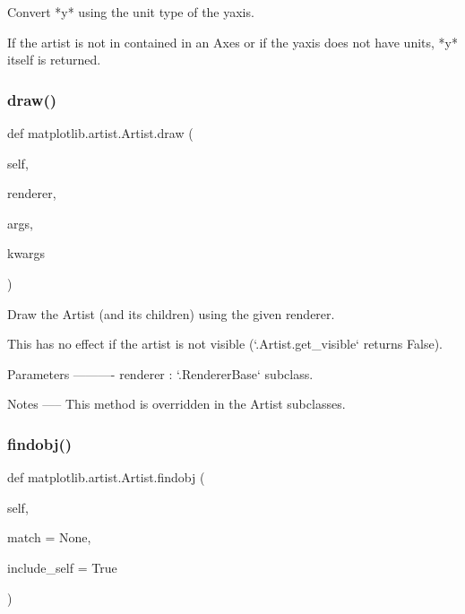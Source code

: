 \begin{DoxyVerb}Convert *y* using the unit type of the yaxis.

If the artist is not in contained in an Axes or if the yaxis does not
have units, *y* itself is returned.
\end{DoxyVerb}
 \mbox{\label{classmatplotlib_1_1artist_1_1Artist_a5ed9a21a1ca45a835ea296f654ae9d35}} 
\subsubsection{\texorpdfstring{draw()}{draw()}}
{\footnotesize\ttfamily def matplotlib.\+artist.\+Artist.\+draw (\begin{DoxyParamCaption}\item[{}]{self,  }\item[{}]{renderer,  }\item[{}]{args,  }\item[{}]{kwargs }\end{DoxyParamCaption})}

\begin{DoxyVerb}Draw the Artist (and its children) using the given renderer.

This has no effect if the artist is not visible (`.Artist.get_visible`
returns False).

Parameters
----------
renderer : `.RendererBase` subclass.

Notes
-----
This method is overridden in the Artist subclasses.
\end{DoxyVerb}
 \mbox{\label{classmatplotlib_1_1artist_1_1Artist_a292ad76fb9ba8524add6abe5f78810f2}} 
\subsubsection{\texorpdfstring{findobj()}{findobj()}}
{\footnotesize\ttfamily def matplotlib.\+artist.\+Artist.\+findobj (\begin{DoxyParamCaption}\item[{}]{self,  }\item[{}]{match = {\ttfamily None},  }\item[{}]{include\+\_\+self = {\ttfamily True} }\end{DoxyParamCaption})}

